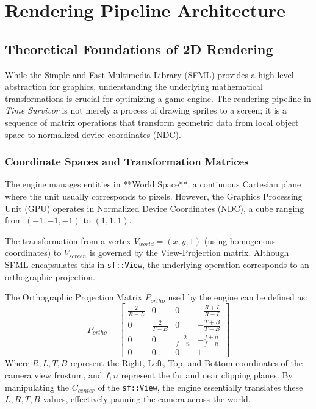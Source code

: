 \documentclass[10pt, a4paper]{article}
\begin{document}
\section{Rendering Pipeline Architecture}

\subsection{Theoretical Foundations of 2D Rendering}
While the Simple and Fast Multimedia Library (SFML) provides a high-level abstraction for graphics, understanding the underlying mathematical transformations is crucial for optimizing a game engine. The rendering pipeline in \textit{Time Survivor} is not merely a process of drawing sprites to a screen; it is a sequence of matrix operations that transform geometric data from local object space to normalized device coordinates (NDC).

\subsubsection{Coordinate Spaces and Transformation Matrices}
The engine manages entities in **World Space**, a continuous Cartesian plane where the unit usually corresponds to pixels. However, the Graphics Processing Unit (GPU) operates in Normalized Device Coordinates (NDC), a cube ranging from $(-1, -1, -1)$ to $(1, 1, 1)$.

The transformation from a vertex $V_{world} = (x, y, 1)$ (using homogenous coordinates) to $V_{screen}$ is governed by the View-Projection matrix. Although SFML encapsulates this in \texttt{sf::View}, the underlying operation corresponds to an orthographic projection.

The Orthographic Projection Matrix $P_{ortho}$ used by the engine can be defined as:
\begin{equation}
P_{ortho} = \begin{bmatrix} 
\frac{2}{R-L} & 0 & 0 & -\frac{R+L}{R-L} \\
0 & \frac{2}{T-B} & 0 & -\frac{T+B}{T-B} \\
0 & 0 & \frac{-2}{f-n} & -\frac{f+n}{f-n} \\
0 & 0 & 0 & 1
\end{bmatrix}
\end{equation}
Where $R, L, T, B$ represent the Right, Left, Top, and Bottom coordinates of the camera view frustum, and $f, n$ represent the far and near clipping planes. By manipulating the $C_{center}$ of the \texttt{sf::View}, the engine essentially translates these $L, R, T, B$ values, effectively panning the camera across the world.
\end{document}

